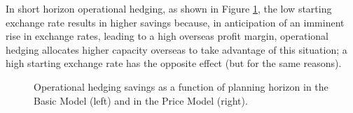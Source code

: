 \documentclass[mnsc,nonblindrev,copyedit]{informs2_wz} %
\begin{document}
{In short horizon operational hedging, as shown in Figure \ref{fig:startExRateOp}, the low starting exchange rate results in higher savings because, in anticipation of an imminent rise in exchange rates, leading to a high overseas profit margin, operational hedging allocates higher capacity overseas to take advantage of this situation; a high starting exchange rate has the opposite effect (but for the same reasons).
\begin{figure}[ht]
\begin{center}
\begin{minipage}{6in}
    \begin{minipage}{3.1in}
        \epsfxsize=2.8in
    \hspace{-0.5in}    
    \end{minipage}
    \begin{minipage}{2.8in}
        \epsfxsize=2.8in
    \hspace{-0.5in}    
    \end{minipage}
\end{minipage}
\vspace{.05in} \caption{Operational hedging savings as a function of planning horizon in the Basic Model (left) and in the Price Model (right).} \label{fig:startExRateOp} \vspace{-.2in}
\end{center}
\end{figure}


}
\end{document}
